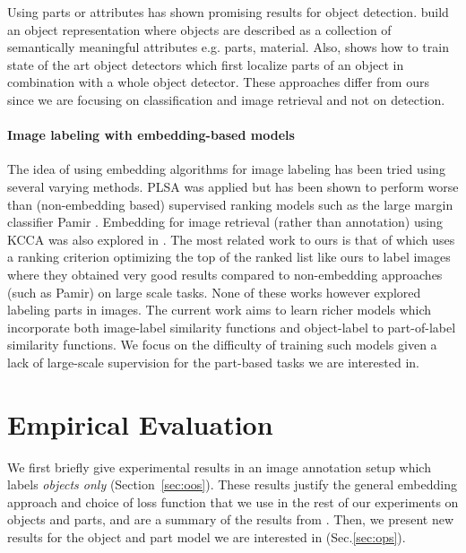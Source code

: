 Using parts or attributes has shown promising results for object detection.
\citep{core} build an object representation where objects are described as a
collection of semantically meaningful attributes e.g. parts, material.  Also, \citep{fel2009}
shows how to train state of the art object detectors which first localize
parts of an object in combination with a whole object detector.
These approaches differ from ours since we are focusing
on classification and image retrieval and not on detection.



\paragraph{Image labeling with embedding-based models}

The idea of using embedding algorithms for image labeling has been tried
using several varying methods.
PLSA \citep{monay2004plsa} was applied but has been shown to perform
worse than (non-embedding based) supervised ranking models such as the large margin classifier
 {\sc Pamir} \citep{grangier:2008:tpami}. Embedding for image retrieval (rather than annotation)
using KCCA was also explored in \citep{zhou2007semi}.
The most related work to ours is that of \citep{wsabie} which uses a ranking criterion
optimizing the top of the ranked list like ours to label images where they obtained very good
results compared to non-embedding approaches (such as {\sc Pamir}) on large scale tasks.
None of these works however explored labeling parts in images.
The current work aims to learn richer models which incorporate both
 image-label similarity functions and object-label to part-of-label similarity functions.
We focus on the difficulty of training such models 
given a lack of large-scale supervision for the part-based tasks we are interested in.


\section{Empirical Evaluation}\label{sec:exp}


We first briefly give experimental results in an image annotation setup which
labels {\em objects only} (Section~\ref{sec:oos}).  These results justify the
general embedding approach and choice of loss function that we use in the rest
of our experiments on objects and parts, and are a summary of the results from
\citep{image-wsabie}.  Then, we present new results for the object and part
model we are interested in (Sec.\ref{sec:ops}).

